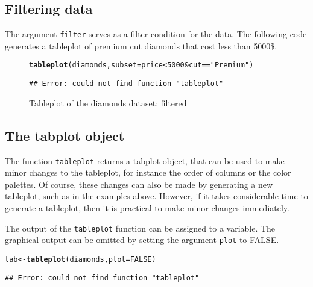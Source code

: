 \documentclass[11pt, fleqn, a4paper]{article}\usepackage{graphicx, color}
\makeatletter
\newcommand{\hlfunctioncall}[1]{\textcolor[rgb]{0.501960784313725,0,0.329411764705882}{\textbf{#1}}}%
\newcommand{\hlstring}[1]{\textcolor[rgb]{0.6,0.6,1}{#1}}%
\newenvironment{kframe}{%
 \def\FrameCommand##1{\hskip\@totalleftmargin \hskip-\fboxsep
 \colorbox{shadecolor}{##1}\hskip-\fboxsep
     \hskip-\linewidth \hskip-\@totalleftmargin \hskip\columnwidth}%
 \MakeFramed {\advance\hsize-\width
   \@totalleftmargin\z@ \linewidth\hsize
   \@setminipage}}%
 {\par\unskip\endMakeFramed}
\newenvironment{knitrout}{}{} %
\makeatother
\begin{document}
\subsection{Filtering data}
The argument {\tt filter} serves as a filter condition for the data. The following code generates a tableplot of premium cut diamonds that cost less than 5000\$.


\begin{figure}[htp]
\begin{knitrout}
\color{fgcolor}\begin{kframe}
\begin{alltt}
\hlfunctioncall{tableplot}(diamonds, subset = price < 5000 & cut == \hlstring{"Premium"})
\end{alltt}
\begin{verbatim}
## Error: could not find function "tableplot"
\end{verbatim}
\end{kframe}
\end{knitrout}

\caption{Tableplot of the diamonds dataset: filtered}
\label{fig:tp5}
\end{figure}



\subsection{The tabplot object}

The function {\tt tableplot} returns a tabplot-object, that can be used to make minor changes to the tableplot, for instance the order of columns or the color palettes. Of course, these changes can also be made by generating a new tableplot, such as in the examples above. However, if it takes considerable time to generate a tableplot, then it is practical to make minor changes immediately.

The output of the {\tt tableplot} function can be assigned to a variable. The graphical output can be omitted by setting the argument {\tt plot} to FALSE.

\begin{knitrout}
\color{fgcolor}\begin{kframe}
\begin{alltt}
tab <- \hlfunctioncall{tableplot}(diamonds, plot = FALSE)
\end{alltt}
\begin{verbatim}
## Error: could not find function "tableplot"
\end{verbatim}
\end{kframe}
\end{knitrout}
\end{document}

